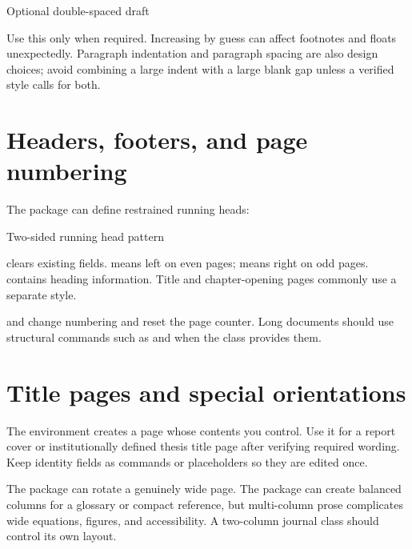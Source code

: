 \begin{latexcode}{Optional double-spaced draft}
\usepackage{setspace}


\doublespacing

\end{latexcode}

Use this only when required. Increasing  by guess can
affect footnotes and floats unexpectedly. Paragraph indentation and paragraph
spacing are also design choices; avoid combining a large indent with a large
blank gap unless a verified style calls for both.

\section{Headers, footers, and page numbering}

The  package can define restrained running heads:

\begin{latexcode}{Two-sided running head pattern}
\usepackage{fancyhdr}
\pagestyle{fancy}
\fancyhf{}
\fancyhead[RO]{\nouppercase{\rightmark}\quad\thepage}
\renewcommand{\headrulewidth}{0.4pt}
\end{latexcode}

\required{} clears existing fields.  means left on even
pages;  means right on odd pages.  contains heading
information. Title and chapter-opening pages commonly use a separate
 style.

 and
 change numbering and reset the page
counter. Long documents should use structural commands such as 
and  when the class provides them.

\section{Title pages and special orientations}

The  environment creates a page whose contents you control.
Use it for a report cover or institutionally defined thesis title page after
verifying required wording. Keep identity fields as commands or placeholders
so they are edited once.

The  package can rotate a genuinely wide page. The
 package can create balanced columns for a glossary or compact
reference, but multi-column prose complicates wide equations, figures, and
accessibility. A two-column journal class should control its own layout.

